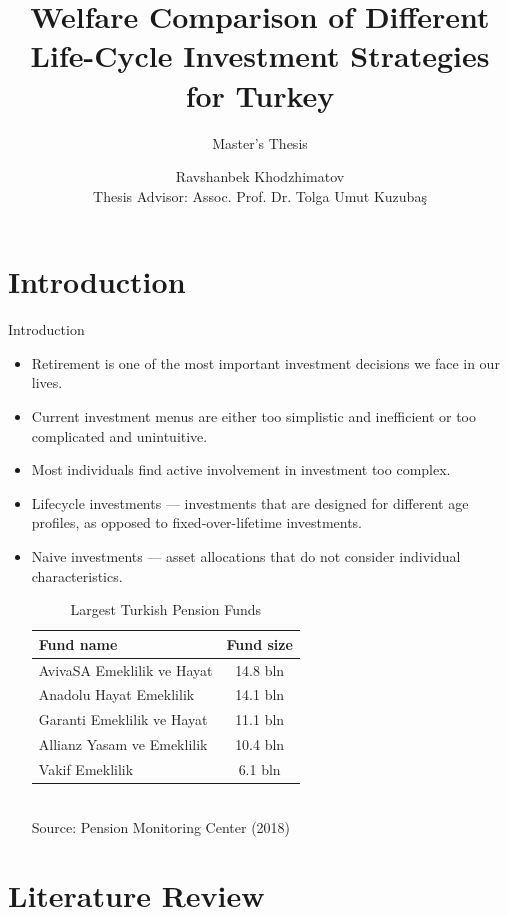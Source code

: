 \documentclass{beamer}
\author{Ravshanbek Khodzhimatov \\Thesis Advisor: Assoc. Prof. Dr. Tolga Umut Kuzuba\c{s}}
\title{Welfare Comparison of Different Life-Cycle Investment Strategies for Turkey}
\subtitle{Master's Thesis}
\begin{document}
\begin{frame}
\titlepage
\end{frame}

\section{Introduction}

\begin{frame}[allowframebreaks]{Introduction}
  \begin{itemize}
	\item Retirement is one of the most important investment decisions we face in our lives.
	\item Current investment menus are either too simplistic and inefficient or too complicated and unintuitive.
	\item Most individuals find active involvement in investment too complex.
	\item Lifecycle investments --- investments that are designed for different age profiles, as opposed to fixed-over-lifetime investments.
	\item Naive investments --- asset allocations that do not consider individual characteristics. 

\framebreak

\begin{table}
	\centering
	\caption{Largest Turkish Pension Funds}
	\begin{tabular}[H]{lc}
		\hline
		Fund name&Fund size\\
		\hline
		AvivaSA Emeklilik ve Hayat&14.8 bln\\
		Anadolu Hayat Emeklilik&14.1 bln\\
		Garanti Emeklilik ve Hayat&11.1 bln\\
		Allianz Yasam ve Emeklilik&10.4 bln\\
		Vakif Emeklilik&6.1 bln\\
		\hline
	\end{tabular}\\
	Source: Pension Monitoring Center (2018)
\end{table}
	
  \end{itemize}
\end{frame}


\section{Literature Review}
\end{document}
